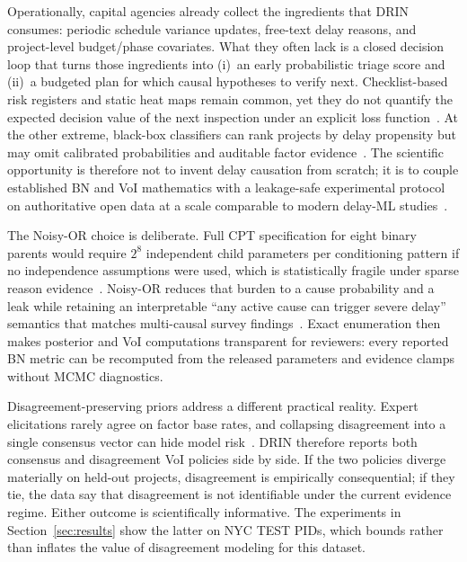 Operationally, capital agencies already collect the ingredients that DRIN consumes: periodic schedule variance updates, free-text delay reasons, and project-level budget/phase covariates. What they often lack is a closed decision loop that turns those ingredients into (i)~an early probabilistic triage score and (ii)~a budgeted plan for which causal hypotheses to verify next. Checklist-based risk registers and static heat maps remain common, yet they do not quantify the expected decision value of the next inspection under an explicit loss function~\cite{Howard1966,Assaf2006}. At the other extreme, black-box classifiers can rank projects by delay propensity but may omit calibrated probabilities and auditable factor evidence~\cite{Egwim2021,Gneiting2007}. The scientific opportunity is therefore not to invent delay causation from scratch; it is to couple established BN and VoI mathematics with a leakage-safe experimental protocol on authoritative open data at a scale comparable to modern delay-ML studies~\cite{Luu2009,Memarzadeh2016,Tagharobi2025}.

The Noisy-OR choice is deliberate. Full CPT specification for eight binary parents would require $2^{8}$ independent child parameters per conditioning pattern if no independence assumptions were used, which is statistically fragile under sparse reason evidence~\cite{Heckerman1996,Onisko2001}. Noisy-OR reduces that burden to a cause probability and a leak while retaining an interpretable ``any active cause can trigger severe delay'' semantics that matches multi-causal survey findings~\cite{Assaf2006,Sambasivan2007,Doloi2012}. Exact enumeration then makes posterior and VoI computations transparent for reviewers: every reported BN metric can be recomputed from the released parameters and evidence clamps without MCMC diagnostics.

Disagreement-preserving priors address a different practical reality. Expert elicitations rarely agree on factor base rates, and collapsing disagreement into a single consensus vector can hide model risk~\cite{Khodabakhshian2025,Luu2009}. DRIN therefore reports both consensus and disagreement VoI policies side by side. If the two policies diverge materially on held-out projects, disagreement is empirically consequential; if they tie, the data say that disagreement is not identifiable under the current evidence regime. Either outcome is scientifically informative. The experiments in Section~\ref{sec:results} show the latter on NYC TEST PIDs, which bounds rather than inflates the value of disagreement modeling for this dataset.
